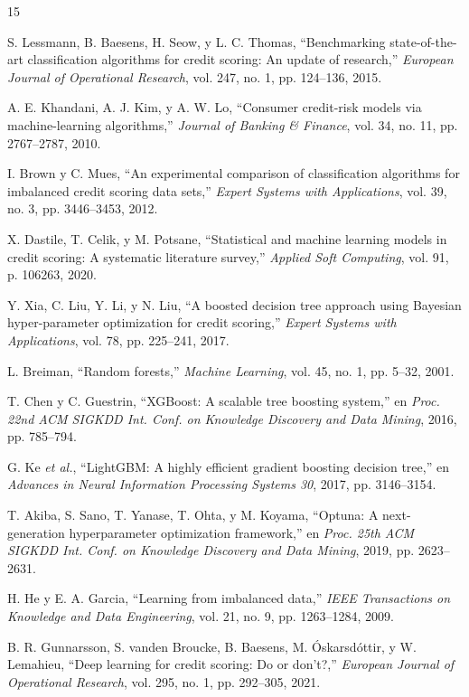 \documentclass[journal]{IEEEtran}
\begin{document}
\begin{thebibliography}{15}

S. Lessmann, B. Baesens, H. Seow, y L. C. Thomas, ``Benchmarking state-of-the-art classification algorithms for credit scoring: An update of research,'' \textit{European Journal of Operational Research}, vol. 247, no. 1, pp. 124--136, 2015.

A. E. Khandani, A. J. Kim, y A. W. Lo, ``Consumer credit-risk models via machine-learning algorithms,'' \textit{Journal of Banking \& Finance}, vol. 34, no. 11, pp. 2767--2787, 2010.

I. Brown y C. Mues, ``An experimental comparison of classification algorithms for imbalanced credit scoring data sets,'' \textit{Expert Systems with Applications}, vol. 39, no. 3, pp. 3446--3453, 2012.

X. Dastile, T. Celik, y M. Potsane, ``Statistical and machine learning models in credit scoring: A systematic literature survey,'' \textit{Applied Soft Computing}, vol. 91, p. 106263, 2020.

Y. Xia, C. Liu, Y. Li, y N. Liu, ``A boosted decision tree approach using Bayesian hyper-parameter optimization for credit scoring,'' \textit{Expert Systems with Applications}, vol. 78, pp. 225--241, 2017.

L. Breiman, ``Random forests,'' \textit{Machine Learning}, vol. 45, no. 1, pp. 5--32, 2001.

T. Chen y C. Guestrin, ``XGBoost: A scalable tree boosting system,'' en \textit{Proc. 22nd ACM SIGKDD Int. Conf. on Knowledge Discovery and Data Mining}, 2016, pp. 785--794.

G. Ke \textit{et al.}, ``LightGBM: A highly efficient gradient boosting decision tree,'' en \textit{Advances in Neural Information Processing Systems 30}, 2017, pp. 3146--3154.

T. Akiba, S. Sano, T. Yanase, T. Ohta, y M. Koyama, ``Optuna: A next-generation hyperparameter optimization framework,'' en \textit{Proc. 25th ACM SIGKDD Int. Conf. on Knowledge Discovery and Data Mining}, 2019, pp. 2623--2631.

H. He y E. A. Garcia, ``Learning from imbalanced data,'' \textit{IEEE Transactions on Knowledge and Data Engineering}, vol. 21, no. 9, pp. 1263--1284, 2009.

B. R. Gunnarsson, S. vanden Broucke, B. Baesens, M. Óskarsdóttir, y W. Lemahieu, ``Deep learning for credit scoring: Do or don't?,'' \textit{European Journal of Operational Research}, vol. 295, no. 1, pp. 292--305, 2021.


\end{thebibliography}
\end{document}
